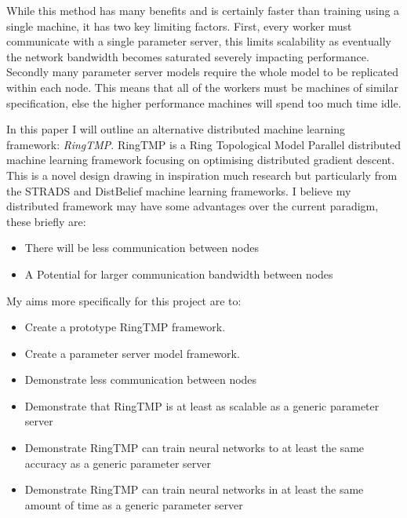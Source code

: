 While this method has many benefits and is certainly faster than training using
a single machine, it has two key limiting factors. First, every worker must
communicate with a single parameter server, this limits scalability as
eventually the network bandwidth becomes saturated severely impacting
performance. \cite{LI2014ParameterServers} Secondly many parameter server models
require the whole model to be replicated within each node.
\cite{jia2018BeyondData} This means that all of the workers must be machines of
similar specification, else the higher performance machines will spend too much
time idle.
\par
In this paper I will outline an alternative distributed machine learning
framework: \textit{RingTMP}. RingTMP is a Ring Topological Model Parallel
distributed machine learning framework focusing on optimising distributed
gradient descent. This is a novel design drawing in inspiration much research
but particularly from the STRADS and DistBelief machine learning frameworks.
\cite{kim2016STRADS,Dean2012Distbelief} I believe my distributed framework may
have some advantages over the current paradigm, these briefly are:
\begin{itemize}
    \item There will be less communication between nodes
    \item A Potential for larger communication bandwidth between nodes
\end{itemize}

My aims more specifically for this project are to:
\begin{itemize}
    \item Create a prototype RingTMP framework.
    \item Create a parameter server model framework.
    \item Demonstrate less communication between nodes
    \item Demonstrate that RingTMP is at least as scalable as a generic parameter
    server
    \item Demonstrate RingTMP can train neural networks to at least the same
    accuracy as a generic parameter server
    \item Demonstrate RingTMP can train neural networks in at least the same
    amount of time as a generic parameter server
\end{itemize}

